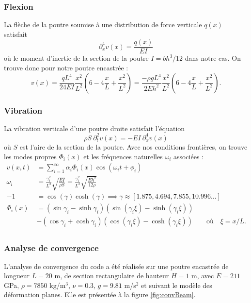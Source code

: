 \documentclass[12pt]{article}
\begin{document}
\subsubsection{Flexion}
La flèche de la poutre soumise à une distribution de force verticale $q(x)$
satisfait
\begin{equation}
    \partial_x^4 v(x) = \frac{q(x)}{EI}
\end{equation}
où le moment d'inertie de la section de la poutre $I=bh^3/12$ dans notre cas. 
On trouve donc pour notre poutre encastrée :
\begin{equation}
    v(x) = \frac{qL^4}{24EI} \frac{x^2}{L^2} \left(6 - 4\frac{x}{L} + \frac{x^2}{L^2}\right)
    = \frac{-\rho g L^4}{2Eh^2}  \frac{x^2}{L^2} \left(6 - 4\frac{x}{L} + \frac{x^2}{L^2}\right).
\end{equation}

\subsubsection{Vibration}
La vibration verticale d'une poutre droite satisfait l'équation
\begin{equation}
    \rho S\: \partial_t^2 v(x) = -EI\:\partial_x^4 v(x)
\end{equation}
où $S$ est l'aire de la section de la poutre. Avec nos conditions frontières,
on trouve les modes propres $\Phi_i(x)$ et les fréquences naturelles 
$\omega_i$ associées :
\begin{equation}
    \begin{aligned}
        v(x,t) &= \sum_{i=1}^{\infty} \alpha_i \Phi_i(x) \cos(\omega_i t + \phi_i)\\
        \omega_i &= \frac{\gamma_i^2}{L^2} \sqrt{\frac{EI}{\rho S}}
            = \frac{\gamma_i^2}{L^2} \sqrt{\frac{E h^2}{12\rho}}\\
        -1 &= \cos(\gamma) \cosh(\gamma) 
        \implies \gamma \approx [1.875, 4.694, 7.855, 10.996\dots]\\
        \Phi_i(x) &= 
        (\sin \gamma_i - \sinh \gamma_i)(\sin (\gamma_i \xi) - \sinh (\gamma_i\xi)) \\
        &+
        (\cos \gamma_i + \cosh \gamma_i)(\cos (\gamma_i \xi) - \cosh (\gamma_i\xi))
        \qquad\text{où}\quad \xi = x/L.\\
    \end{aligned}
\end{equation}

\subsubsection{Analyse de convergence}
L'analyse de convergence du code a été réalisée sur une poutre encastrée 
de longueur $L=20$ m, de section rectangulaire de hauteur $H=1$ m, 
avec $E=211$ GPa, $\rho=7850$ kg/m$^3$, $\nu=0.3$, $g=9.81$ m/s$^2$
et suivant le modèle des déformation planes.
Elle est présentée à la figure \ref{fig:convBeam}.
\end{document}
